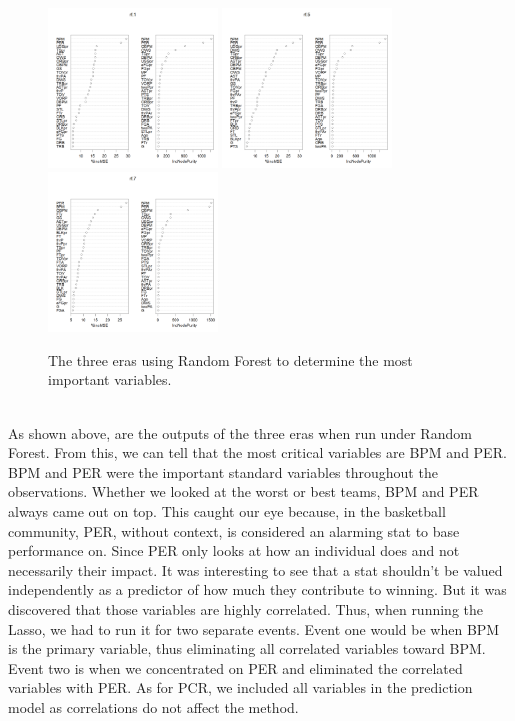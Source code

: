\documentclass[11pt,letterpaper]{amsart}
\begin{document}
\begin{figure}[H] 
\includegraphics[width=0.4\textwidth]{rfera1}\hspace{1cm}
\includegraphics[width=0.4\textwidth]{rfera2}\hspace{1cm}
\includegraphics[width=0.4\textwidth]{rfera3}\hspace{1cm}
\caption{The three eras using Random Forest to determine the most important variables. \label{fig6}}
\end{figure} \leavevmode\\
As shown above, are the outputs of the three eras when run under Random Forest. From this, we can tell that the most critical variables are BPM and PER. BPM and PER were the important standard variables throughout the observations. Whether we looked at the worst or best teams, BPM and PER always came out on top. This caught our eye because, in the basketball community, PER, without context, is considered an alarming stat to base performance on. Since PER only looks at how an individual does and not necessarily their impact. It was interesting to see that a stat shouldn’t be valued independently as a predictor of how much they contribute to winning. But it was discovered that those variables are highly correlated. Thus, when running the Lasso, we had to run it for two separate events. Event one would be when BPM is the primary variable, thus eliminating all correlated variables toward BPM. Event two is when we concentrated on PER and eliminated the correlated variables with PER. As for PCR, we included all variables in the prediction model as correlations do not affect the method. \\\\
\end{document}
